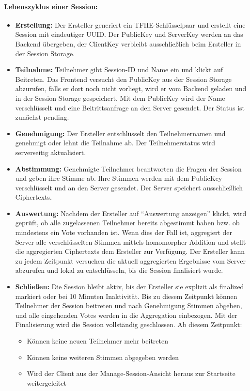 \paragraph{Lebenszyklus einer
Session:}\label{lebenszyklus-einer-session}

\begin{itemize}
\item
  \textbf{Erstellung:} Der Ersteller generiert ein TFHE-Schlüsselpaar
  und erstellt eine Session mit eindeutiger UUID. Der PublicKey und
  ServerKey werden an das Backend übergeben, der ClientKey verbleibt
  ausschließlich beim Ersteller in der Session Storage.
\item
  \textbf{Teilnahme:} Teilnehmer gibt Session-ID und Name ein und klickt
  auf Beitreten. Das Frontend versucht den PublicKey aus der Session
  Storage abzurufen, falls er dort noch nicht vorliegt, wird er vom
  Backend geladen und in der Session Storage gespeichert. Mit dem
  PublicKey wird der Name verschlüsselt und eine Beitrittsanfrage an den
  Server gesendet. Der Status ist zunächst pending.
\item
  \textbf{Genehmigung:} Der Ersteller entschlüsselt den Teilnehmernamen
  und genehmigt oder lehnt die Teilnahme ab. Der Teilnehmerstatus wird
  serverseitig aktualisiert.
\item
  \textbf{Abstimmung:} Genehmigte Teilnehmer beantworten die Fragen der
  Session und geben ihre Stimme ab. Ihre Stimmen werden mit dem
  PublicKey verschlüsselt und an den Server gesendet. Der Server
  speichert ausschließlich Ciphertexts.
\item
  \textbf{Auswertung:} Nachdem der Ersteller auf ``Auswertung anzeigen''
  klickt, wird geprüft, ob alle zugelassenen Teilnehmer bereits
  abgestimmt haben bzw. ob mindestens ein Vote vorhanden ist. Wenn dies
  der Fall ist, aggregiert der Server alle verschlüsselten Stimmen
  mittels homomorpher Addition und stellt die aggregierten Ciphertexts
  dem Ersteller zur Verfügung. Der Ersteller kann zu jedem Zeitpunkt
  versuchen die aktuell aggregierten Ergebnisse vom Server abzurufen und
  lokal zu entschlüsseln, bis die Session finalisiert wurde.
\item
  \textbf{Schließen:} Die Session bleibt aktiv, bis der Ersteller sie
  explizit als finalized markiert oder bei 10 Minuten Inaktivität. Bis
  zu diesem Zeitpunkt können Teilnehmer der Session beitreten und nach
  Genehmigung Stimmen abgeben, und alle eingehenden Votes werden in die
  Aggregation einbezogen. Mit der Finalisierung wird die Session
  vollständig geschlossen. Ab diesem Zeitpunkt:
  \begin{itemize}
    \item
    Können keine neuen Teilnehmer mehr beitreten
  \item
    Können keine weiteren Stimmen abgegeben werden
  \item
    Wird der Client aus der Manage-Session-Ansicht heraus zur Startseite
    weitergeleitet
    \end{itemize}
\end{itemize}

